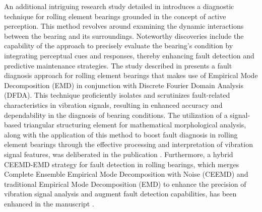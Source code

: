 \documentclass[sn-basic,pdflatex]{sn-jnl}
\theoremstyle{remark}
\theoremstyle{definition}
\begin{document}
An additional intriguing research study detailed in
\citet{WOS:000360994300029} introduces a diagnostic technique for
rolling element bearings grounded in the concept of active perception.
This method revolves around examining the dynamic interactions between
the bearing and its surroundings. Noteworthy discoveries include the
capability of the approach to precisely evaluate the bearing's condition
by integrating perceptual cues and responses, thereby enhancing fault
detection and predictive maintenance strategies. The study described in
\citet{WOS:000343577703075} presents a fault diagnosis approach for
rolling element bearings that makes use of Empirical Mode Decomposition
(EMD) in conjunction with Discrete Fourier Domain Analysis (DFDA). This
technique proficiently isolates and scrutinizes fault-related
characteristics in vibration signals, resulting in enhanced accuracy and
dependability in the diagnosis of bearing conditions. The utilization of
a signal-based triangular structuring element for mathematical
morphological analysis, along with the application of this method to
boost fault diagnosis in rolling element bearings through the effective
processing and interpretation of vibration signal features, was
deliberated in the publication \citet{WOS:000334316700001}. Furthermore,
a hybrid CEEMD-EMD strategy for fault detection in rolling bearings,
which merges Complete Ensemble Empirical Mode Decomposition with Noise
(CEEMD) and traditional Empirical Mode Decomposition (EMD) to enhance
the precision of vibration signal analysis and augment fault detection
capabilities, has been enhanced in the manuscript
\citet{WOS:000412752200052}.
\end{document}
